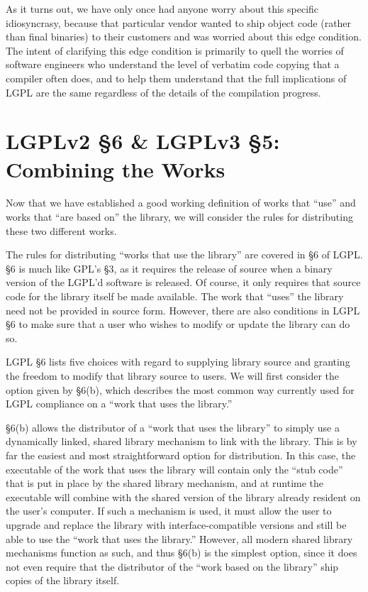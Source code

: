 As it turns out, we have only once had anyone worry about this specific
idiosyncrasy, because that particular vendor wanted to ship object code
(rather than final binaries) to their customers and was worried about
this edge condition. The intent of clarifying this edge condition is
primarily to quell the worries of software engineers who understand the
level of verbatim code copying that a compiler often does, and to help
them understand that the full implications of LGPL are the same regardless
of the details of the compilation progress.

\section{LGPLv2 \S 6 \& LGPLv3 \S 5: Combining the Works}
\label{lgpl-section-6}
Now that we have established a good working definition of works that
``use'' and works that ``are based on'' the library, we will consider the
rules for distributing these two different works.

The rules for distributing ``works that use the library'' are covered in
\S 6 of LGPL\@. \S 6 is much like GPL's \S 3, as it requires the release
of source when a binary version of the LGPL'd software is released. Of
course, it only requires that source code for the library itself be made
available. The work that ``uses'' the library need not be provided in
source form. However, there are also conditions in LGPL \S 6 to make sure
that a user who wishes to modify or update the library can do so.

LGPL \S 6 lists five choices with regard to supplying library source
and granting the freedom to modify that library source to users. We
will first consider the option given by \S 6(b), which describes the
most common way currently used for LGPL compliance on a ``work that
uses the library.''

\S 6(b) allows the distributor of a ``work that uses the library'' to
simply use a dynamically linked, shared library mechanism to link with the
library. This is by far the easiest and most straightforward option for
distribution. In this case, the executable of the work that uses the
library will contain only the ``stub code'' that is put in place by the
shared library mechanism, and at runtime the executable will combine with
the shared version of the library already resident on the user's computer.
If such a mechanism is used, it must allow the user to upgrade and
replace the library with interface-compatible versions and still be able
to use the ``work that uses the library.''  However, all modern shared
library mechanisms function as such, and thus \S 6(b) is the simplest
option, since it does not even require that the distributor of the ``work
based on the library'' ship copies of the library itself.

